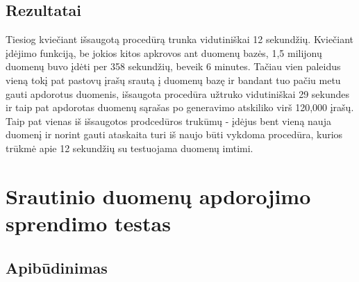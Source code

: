 \documentclass{VUMIFPSkursinis}
\begin{document}
\subsection{Rezultatai}

Tiesiog kviečiant išsaugotą procedūrą trunka vidutiniškai 12 sekundžių. Kviečiant įdėjimo funkciją, be jokios kitos apkrovos ant duomenų bazės, 1,5 milijonų duomenų
buvo įdėti per 358 sekundžių, beveik 6 minutes. Tačiau vien paleidus vieną tokį pat pastovų įrašų srautą į duomenų bazę ir bandant tuo pačiu metu gauti apdorotus duomenis, išsaugota
procedūra užtruko vidutiniškai 29 sekundes ir taip pat apdorotas duomenų sąrašas po generavimo atskiliko virš 120,000 įrašų. Taip pat vienas iš 
išsaugotos prodcedūros trukūmų - įdėjus bent vieną nauja duomenį ir norint gauti ataskaita turi iš naujo būti vykdoma procedūra, kurios trūkmė apie 12 sekundžių
su testuojama duomenų imtimi.

\section{Srautinio duomenų apdorojimo sprendimo testas}

\subsection{Apibūdinimas}
\end{document}
